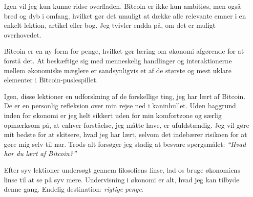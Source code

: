 Igen vil jeg kun kunne ridse overfladen. Bitcoin er ikke kun ambitiøs, men også 
bred og dyb i omfang, hvilket gør det umuligt at dække alle relevante emner i en 
enkelt lektion, artikel eller bog. Jeg tvivler endda på, om det er muligt 
overhovedet.

Bitcoin er en ny form for penge, hvilket gør læring om økonomi afgørende for at 
forstå det. At beskæftige sig med menneskelig handlinger og interaktionerne 
mellem økonomiske mæglere er sandsynligvis et af de største og mest uklare 
elementer i Bitcoin-puslespillet.

Igen, disse lektioner en udforskning af de forskellige ting, jeg har lært af 
Bitcoin. De er en personlig refleksion over min rejse ned i kaninhullet. Uden 
baggrund inden for økonomi er jeg helt sikkert uden for min komfortzone og 
særlig opmærksom på, at enhver forståelse, jeg måtte have, er ufuldstændig. Jeg 
vil gøre mit bedste for at skitsere, hvad jeg har lært, selvom det indebærer 
risikoen for at gøre mig selv til nar. Trods alt forsøger jeg stadig at besvare
spørgsmålet: \textit{\enquote{Hvad har du lært af Bitcoin?}}

Efter syv lektioner undersøgt gennem filosofiens linse, lad os bruge økonomiens 
linse til at se på syv mere. Undervisning i økonomi er alt, hvad jeg kan 
tilbyde denne gang. Endelig destination: \textit{rigtige penge}.

